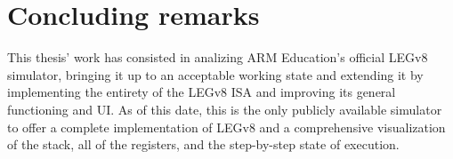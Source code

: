 \chapter*{Concluding remarks}
\label{chap:concl}

This thesis' work has consisted in analizing ARM Education's official LEGv8 simulator, bringing it up to an acceptable working state and extending it by implementing the entirety of the LEGv8 ISA and improving its general functioning and UI. As of this date, this is the only publicly available simulator to offer a complete implementation of LEGv8 and a comprehensive visualization of the stack, all of the registers, and the step-by-step state of execution.

